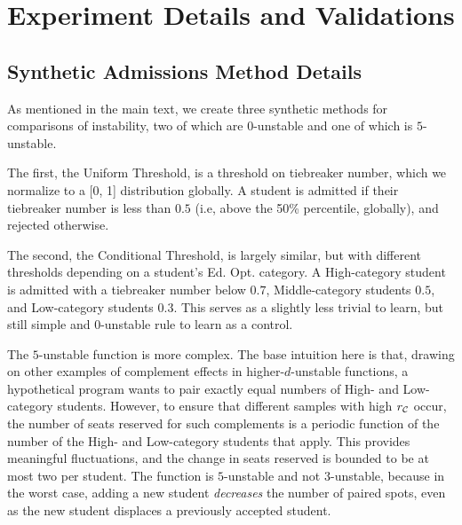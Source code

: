 \section{Experiment Details and Validations} \label{sec:empirics-appendix}

\subsection{Synthetic Admissions Method Details} \label{sec:synthetics-appendix}
As mentioned in the main text, we create three synthetic methods for comparisons of instability, two of which are $0$-unstable and one of which is $5$-unstable.

The first, the Uniform Threshold, is a threshold on tiebreaker number, which we normalize to a [0, 1] distribution globally. A student is admitted if their tiebreaker number is less than $0.5$ (i.e, above the 50\% percentile, globally), and rejected otherwise.

The second, the Conditional Threshold, is largely similar, but with different thresholds depending on a student's Ed. Opt. category. A High-category student is admitted with a tiebreaker number below $0.7$, Middle-category students $0.5$, and Low-category students $0.3$. This serves as a slightly less trivial to learn, but still simple and $0$-unstable rule to learn as a control.

The $5$-unstable function is more complex. The base intuition here is that, drawing on other examples of complement effects in higher-$d$-unstable functions, a hypothetical program wants to pair exactly equal numbers of High- and Low-category students. However, to ensure that different samples with high $r_{\mathcal{C}}$ occur, the number of seats reserved for such complements is a periodic function of the number of the High- and Low-category students that apply. This provides meaningful fluctuations, and the change in seats reserved is bounded to be at most two per student. The function is $5$-unstable and not $3$-unstable, because in the worst case, adding a new student \textit{decreases} the number of paired spots, even as the new student displaces a previously accepted student.

